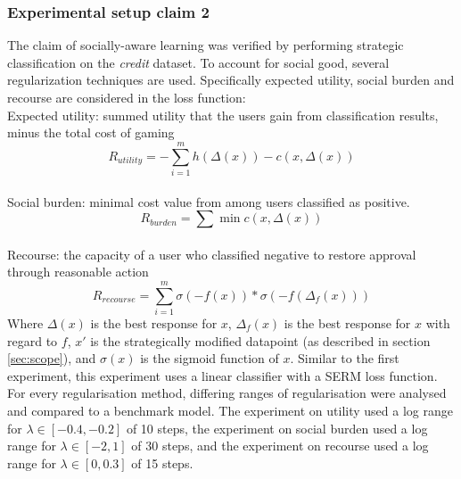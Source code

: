 \subsubsection{Experimental setup claim 2} 
The claim of socially-aware learning was verified by performing strategic classification on the \textit{credit} dataset. To account for social good, several regularization techniques are used. Specifically expected utility, social burden and recourse are considered in the loss function:\\

Expected utility: summed utility that the users gain from classification results, minus the total cost of gaming
\begin{equation}\label{eq:r_util}
     R_{utility} = -\sum^m_{i=1} h(\Delta(x)) - c(x,\Delta(x))
\end{equation}\\
Social burden: minimal cost value from among users classified as positive.
\begin{equation}\label{eq:r_burden}
    R_{burden} = \sum \min c(x,\Delta(x)) %
\end{equation}
\\
Recourse: the capacity of a user who classified negative to restore approval through reasonable action
\begin{equation}\label{eq:r_recourse}
    R_{recourse} = \sum^m_{i=1}\sigma(-f(x)) * \sigma(-f(\Delta_{f}(x)))
\end{equation}
Where $\Delta(x)$ is the best response for $x$, $\Delta_{f}(x)$ is the best response for $x$ with regard to $f$, $x'$ is the strategically modified datapoint (as described in section \ref{sec:scope}), and $\sigma(x)$ is the sigmoid function of $x$.  Similar to the first experiment, this experiment uses a linear classifier with a SERM loss function. For every regularisation method, differing ranges of regularisation were analysed and compared to a benchmark model. The experiment on utility used a log range for $\lambda \in [-0.4,-0.2]$ of 10 steps, the experiment on social burden used a log range for $\lambda \in [-2,1]$ of 30 steps, and the experiment on recourse used a log range for $\lambda \in [0,0.3]$ of 15 steps.

